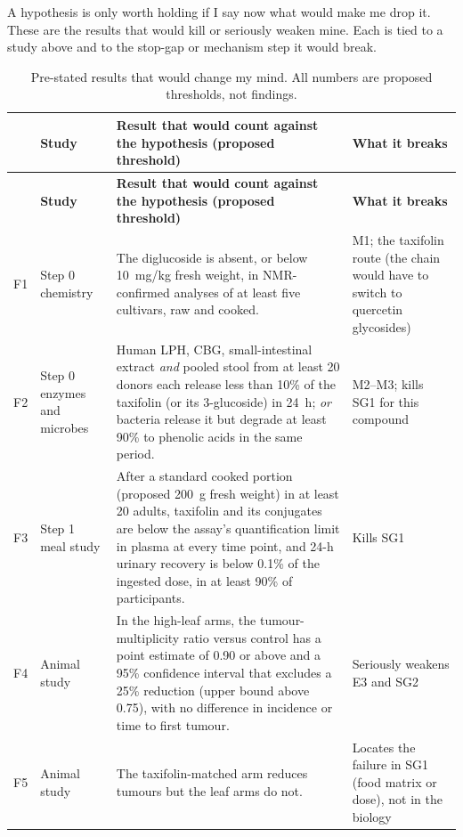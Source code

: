 \documentclass[11pt,a4paper]{article}
\begin{document}
A hypothesis is only worth holding if I say now what would make me drop it. These are the results that would kill or seriously weaken mine. Each is tied to a study above and to the stop-gap or mechanism step it would break.

{\small\sloppy
\renewcommand{\arraystretch}{1.3}
\begin{longtable}{@{}>{\raggedright\arraybackslash}p{0.7cm} >{\raggedright\arraybackslash}p{2.6cm} >{\raggedright\arraybackslash}p{8.3cm} >{\raggedright\arraybackslash}p{3.0cm}@{}}
\caption{Pre-stated results that would change my mind. All numbers are proposed thresholds, not findings.}\label{tab:falsify}\\
\toprule
& \textbf{Study} & \textbf{Result that would count against the hypothesis (proposed threshold)} & \textbf{What it breaks}\\
\midrule\endfirsthead
\toprule
& \textbf{Study} & \textbf{Result that would count against the hypothesis (proposed threshold)} & \textbf{What it breaks}\\
\midrule\endhead
\bottomrule\endfoot
F1 & Step 0 chemistry & The diglucoside is absent, or below 10~mg/kg fresh weight, in NMR-confirmed analyses of at least five cultivars, raw and cooked. & M1; the taxifolin route (the chain would have to switch to quercetin glycosides)\\
F2 & Step 0 enzymes and microbes & Human LPH, CBG, small-intestinal extract \emph{and} pooled stool from at least 20 donors each release less than 10\% of the taxifolin (or its 3-glucoside) in 24~h; \emph{or} bacteria release it but degrade at least 90\% to phenolic acids in the same period. & M2--M3; kills SG1 for this compound\\
F3 & Step 1 meal study & After a standard cooked portion (proposed 200~g fresh weight) in at least 20 adults, taxifolin and its conjugates are below the assay's quantification limit in plasma at every time point, and 24-h urinary recovery is below 0.1\% of the ingested dose, in at least 90\% of participants. & Kills SG1\\
F4 & Animal study & In the high-leaf arms, the tumour-multiplicity ratio versus control has a point estimate of 0.90 or above and a 95\% confidence interval that excludes a 25\% reduction (upper bound above 0.75), with no difference in incidence or time to first tumour. & Seriously weakens E3 and SG2\\
F5 & Animal study & The taxifolin-matched arm reduces tumours but the leaf arms do not. & Locates the failure in SG1 (food matrix or dose), not in the biology\\

\end{longtable}}
\end{document}
